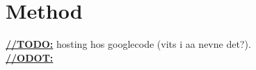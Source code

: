 \chapter{Method}




\underline{\textbf{\LARGE //TODO:}}
hosting hos googlecode (vits i aa nevne det?).
\\ \underline{\textbf{\LARGE //ODOT:}}

